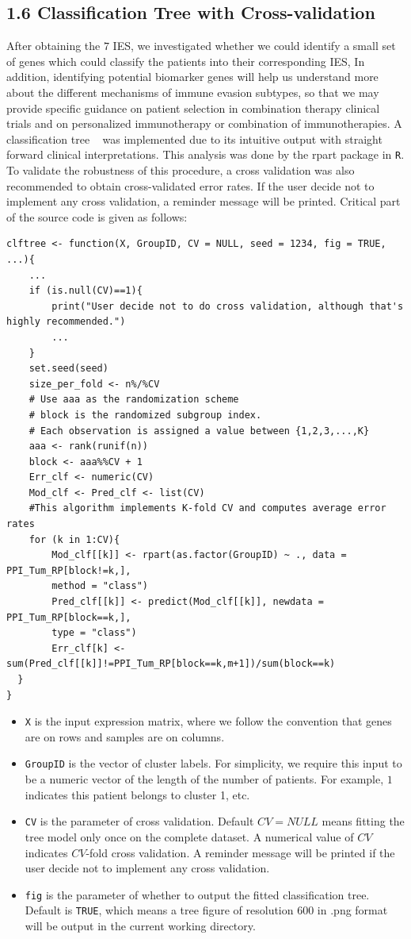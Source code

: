 \documentclass[a4paper, 11pt]{article}
\begin{document}
\subsection*{1.6 Classification Tree with Cross-validation}
After obtaining the $7$ IES, we investigated whether we could identify a small set of genes which could classify the patients into their corresponding IES, In addition, identifying potential biomarker genes will help us understand more about the different mechanisms of immune evasion subtypes, so that we may provide specific guidance on patient selection in combination therapy clinical trials and  on  personalized immunotherapy or combination of immunotherapies.
A classification tree ~\citep{breiman1984classification, atkinson2000introduction} was implemented due to its intuitive output with straight forward clinical interpretations. This analysis was done by the rpart package in \texttt{R}. To validate the robustness of this procedure, a cross validation was also recommended to obtain cross-validated error rates. If the user decide not to implement any cross validation, a reminder message will be printed. Critical part of the source code is given as follows:
\begin{lstlisting}
clftree <- function(X, GroupID, CV = NULL, seed = 1234, fig = TRUE, ...){
	...	
	if (is.null(CV)==1){
    	print("User decide not to do cross validation, although that's highly recommended.")
    	...
  	}
  	set.seed(seed)
  	size_per_fold <- n%/%CV
  	# Use aaa as the randomization scheme
  	# block is the randomized subgroup index. 
  	# Each observation is assigned a value between {1,2,3,...,K}
  	aaa <- rank(runif(n))
  	block <- aaa%%CV + 1
  	Err_clf <- numeric(CV)
  	Mod_clf <- Pred_clf <- list(CV)
  	#This algorithm implements K-fold CV and computes average error rates
  	for (k in 1:CV){
    	Mod_clf[[k]] <- rpart(as.factor(GroupID) ~ ., data = PPI_Tum_RP[block!=k,], 
    	method = "class")
    	Pred_clf[[k]] <- predict(Mod_clf[[k]], newdata = PPI_Tum_RP[block==k,], 
    	type = "class")
    	Err_clf[k] <- sum(Pred_clf[[k]]!=PPI_Tum_RP[block==k,m+1])/sum(block==k)
  }
}
\end{lstlisting}
\begin{itemize}
\item \texttt{X} is the input expression matrix, where we follow the convention that genes are on rows and samples are on columns.
\item \texttt{GroupID} is the vector of cluster labels. For simplicity, we require this input to be a numeric vector of the length of the number of patients. For example, $1$ indicates this patient belongs to cluster 1, etc.
\item \texttt{CV} is the parameter of cross validation. Default $CV=NULL$ means fitting the tree model only once on the complete dataset. A numerical value of $CV$ indicates $CV$-fold cross validation. A reminder message will be printed if the user decide not to implement any cross validation.
\item \texttt{fig} is the parameter of whether to output the fitted classification tree. Default is \texttt{TRUE}, which means a tree figure of resolution $600$ in .png format will be output in the current working directory.
\end{itemize}
\end{document}
